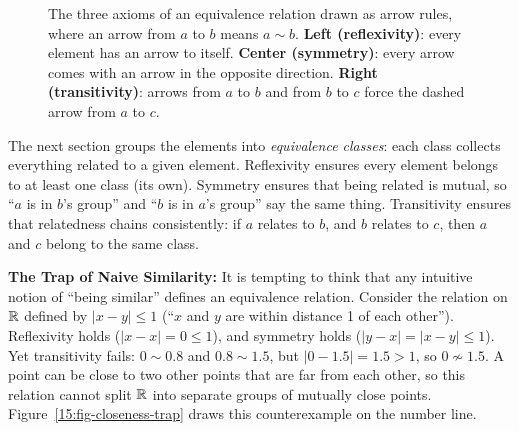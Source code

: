 \begin{figure}[htbp]
\caption{The three axioms of an equivalence relation drawn as arrow rules, where an arrow from $a$ to $b$ means $a \sim b$. \textbf{Left (reflexivity)}: every element has an arrow to itself. \textbf{Center (symmetry)}: every arrow comes with an arrow in the opposite direction. \textbf{Right (transitivity)}: arrows from $a$ to $b$ and from $b$ to $c$ force the dashed arrow from $a$ to $c$.}
\label{15:fig-three-axioms}
\end{figure}

\begin{intuitionbox}
The next section groups the elements into \emph{equivalence classes}: each class collects everything related to a given element. Reflexivity ensures every element belongs to at least one class (its own). Symmetry ensures that being related is mutual, so ``$a$ is in $b$'s group'' and ``$b$ is in $a$'s group'' say the same thing. Transitivity ensures that relatedness chains consistently: if $a$ relates to $b$, and $b$ relates to $c$, then $a$ and $c$ belong to the same class.
\end{intuitionbox}

\begin{trapbox}
\textbf{The Trap of Naive Similarity:}
It is tempting to think that any intuitive notion of ``being similar'' defines an equivalence relation. Consider the relation on $\mathbb{R}$ defined by $|x - y| \le 1$ (``$x$ and $y$ are within distance 1 of each other''). 
Reflexivity holds ($|x - x| = 0 \le 1$), and symmetry holds ($|y - x| = |x - y| \le 1$). 
Yet transitivity fails: $0 \sim 0.8$ and $0.8 \sim 1.5$, but $|0 - 1.5| = 1.5 > 1$, so $0 \not\sim 1.5$.
A point can be close to two other points that are far from each other, so this relation cannot split $\mathbb{R}$ into separate groups of mutually close points. Figure~\ref{15:fig-closeness-trap} draws this counterexample on the number line.
\end{trapbox}

